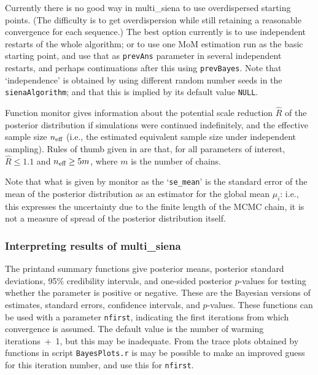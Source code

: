 \documentclass[a4paper,fleqn,11pt]{article}
\newcommand{\+}{\, + \,}
\newcommand{\sfn}[1]{\textsf{#1}}
\begin{document}
Currently there is no good way in \sfn{multi\_siena} to use
overdispersed starting points. (The difficulty is to get overdispersion
while still retaining a reasonable convergence for each sequence.)
The best option currently is to use independent restarts of the whole
algorithm; or to use one MoM estimation run as the basic starting
point, and use that as \texttt{prevAns} parameter in several independent
restarts, and perhaps continuations after this using \texttt{prevBayes}.
Note that `independence' is obtained by using different random
number seeds in the \texttt{sienaAlgorithm}; and that this is implied
by its default value \texttt{NULL}.

Function \sfn{monitor} gives information about the potential
scale reduction $\hat R$ of the posterior distribution if simulations
were continued indefinitely, and the effective sample size
$n_{\text{\scriptsize eff}}$ (i.e., the estimated equivalent
sample size under independent sampling).
Rules of thumb given in \citet[][p. 287]{BDA3} are that,
for all parameters of interest,
$\hat R \leq 1.1$ and $n_{\text{\scriptsize eff}} \geq 5m$,
where $m$ is the number of chains.

Note that what is given by \sfn{monitor} as the
`\texttt{se\_mean}' is the standard error of the mean
of the posterior distribution as an estimator for
the global mean $\mu_i$: i.e., this expresses the uncertainty
due to the finite length of the MCMC chain, it is not
a measure of spread of the posterior distribution itself.


\subsubsection{Interpreting results of multi\_siena}
\label{S_multi_sienaInterpret}

The \textsf{print}and \textsf{summary} functions
give posterior means, posterior standard deviations, 95\% credibility intervals,
and one-sided posterior $p$-values
for testing whether the parameter is positive or negative.
These are the Bayesian versions of estimates, standard errors,
confidence intervals, and $p$-values.
These functions can be used with a parameter \texttt{nfirst}, indicating
the first iterations from which convergence is assumed.
The default value is the number of warming iterations~+~1,
but this may be inadequate. From the trace plots obtained by
functions in script  \texttt{BayesPlots.r} is may be possible
to make an improved guess for this iteration number,
and use this for \texttt{nfirst}.
\end{document}
